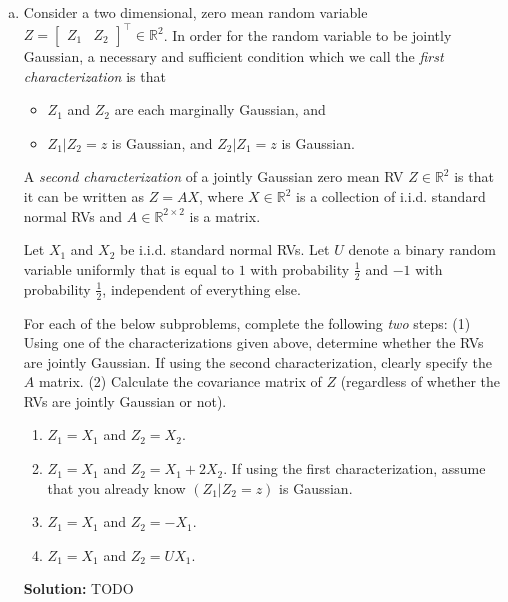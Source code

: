 \documentclass{article}
\newenvironment{solution}{\color{blue} \smallskip \textbf{Solution:}}{}
\begin{document}
\begin{enumerate}[(a)]
    \item Consider a two dimensional, zero mean random variable $Z = \begin{bmatrix} Z_1 & Z_2 \end{bmatrix}^\top \in \mathbb{R}^2$. 
    In order for the random variable to be jointly Gaussian, a necessary and sufficient condition which we call the \textit{first characterization} is that 
    \begin{itemize}
        \item $Z_1$ and $Z_2$ are each marginally Gaussian, and
        \item $Z_1 | Z_2 = z$ is Gaussian, and $Z_2 | Z_1 = z$ is Gaussian.
    \end{itemize}

    A \textit{second characterization} of a jointly Gaussian zero mean RV $Z \in \mathbb{R}^2$ is that it can be written as $Z = A X$, where $X \in \mathbb{R}^2$ is a collection of i.i.d. standard normal RVs and $A \in \mathbb{R}^{2 \times 2}$ is a matrix.

    Let $X_1$ and $X_2$ be i.i.d. standard normal RVs. Let $U$ denote a binary random variable uniformly that is equal to $1$ with probability $\frac{1}{2}$ and $-1$ with probability $\frac{1}{2}$, independent of everything else. 

    For each of the below subproblems, complete the following \emph{two} steps:
    (1) Using one of the characterizations given above, determine whether the RVs are jointly Gaussian. If using the second characterization, clearly specify the $A$ matrix. 
    (2) Calculate the covariance matrix of $Z$ (regardless of whether the RVs are jointly Gaussian or not).

    \begin{enumerate}[(i.)]
        \item $Z_1 = X_1$ and $Z_2 = X_2$.
        \item $Z_1 = X_1$ and $Z_2 = X_1 + 2X_2$. If using the first characterization, assume that you already know $(Z_1 | Z_2 = z)$ is Gaussian. %
        \item $Z_1 = X_1$ and $Z_2 = -X_1$.
        \item $Z_1 = X_1$ and $Z_2 = U X_1$.
    \end{enumerate}

    \begin{solution}
        TODO
    \end{solution}


\end{enumerate}
\end{document}
